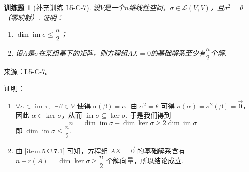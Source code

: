 \documentclass[12pt,fontset=fandol]{ctexart}
\newtheorem{exercise}{训练题}[section]
\begin{document}
\begin{exercise}[补充训练 L5-C-7]\label{prob:L5-C-7}
设$V$是一个$n$维线性空间，$\sigma\in \mathcal{L}(V,V)$，且$\sigma^2=\theta$（零映射）. 证明：
        \begin{enumerate}
            \item $ \dim \operatorname{im} \sigma \leqslant \dfrac{n}{2} $；

            \item 设$A$是$\sigma$在某组基下的矩阵，则方程组$AX=0$的基础解系至少有$\dfrac{n}{2}$个解.
        \end{enumerate}
\end{exercise}
\noindent 来源：\href{https://github.com/yhwu-is/Linear-Algebra-Left-Undone/blob/new/%E8%AE%B2%E4%B9%89/%E4%B8%93%E9%A2%98/5%20%E7%BA%BF%E6%80%A7%E6%98%A0%E5%B0%84.tex}{L5-C-7}。
\begin{solve}
证明：\begin{enumerate}
                \item \label{item:5:C:7:1}
                      $ \forall \alpha \in \operatorname{im} \sigma,\enspace \exists \beta \in V $ 使得 $ \sigma(\beta) = \alpha $. 由 $ \sigma^2 = \theta $ 可得 $ \sigma(\alpha) = \sigma^2(\beta) = \vec{0} $，因此 $ \alpha \in \ker \sigma $，从而 $ \operatorname{im} \sigma \subseteq \ker \sigma $. 于是我们得到
                      \[ n = \dim \operatorname{im} \sigma + \dim \ker \sigma \geqslant 2 \dim \operatorname{im} \sigma \]
                      即 $ \dim \operatorname{im} \sigma \leqslant \dfrac{n}{2} $.

                \item 由 \eqref{item:5:C:7:1} 可知，方程组 $ AX = \vec{0} $ 的基础解系含有 $ n - r(A) = \dim \ker \sigma \geqslant \dfrac{n}{2} $ 个解向量，所以结论成立.
            \end{enumerate}
\end{solve}
\end{document}
